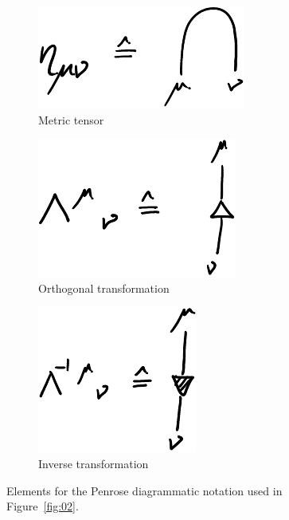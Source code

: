\documentclass[11pt, english, fleqn, DIV=15, headinclude]{scrartcl}
\begin{document}
\begin{figure}
    \centering
    \begin{subfigure}[c]{0.3\linewidth}
        \centering
        \includegraphics{Diagrams-page-01-crop.pdf}
        \caption{%
            Metric tensor
        }
        \label{fig:/1}
    \end{subfigure}
    \hfill
    \begin{subfigure}[c]{0.3\linewidth}
        \centering
        \includegraphics{Diagrams-page-03-crop.pdf}
        \caption{%
            Orthogonal transformation
        }
        \label{fig:/2}
    \end{subfigure}
    \hfill
    \begin{subfigure}[c]{0.3\linewidth}
        \centering
        \includegraphics{Diagrams-page-04-crop.pdf}
        \caption{%
            Inverse transformation
        }
        \label{fig:/2}
    \end{subfigure}
    \caption{%
        Elements for the Penrose diagrammatic notation used in
        Figure~\ref{fig:02}.
    }
    \label{fig:01}
\end{figure}
\end{document}
